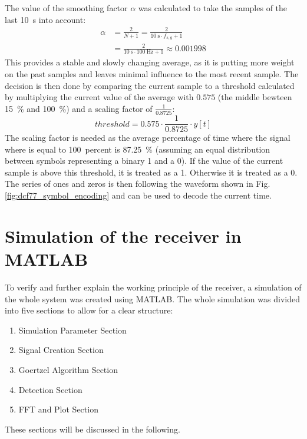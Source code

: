 \documentclass[conference]{IEEEtran}
\begin{document}
\FloatBarrier\noindent
The value of the smoothing factor $\alpha$ was calculated to take the samples of the last \SI{10}{\second} into account:
\begin{equation}
    \begin{split}
        \alpha &= \frac{2}{N + 1} = \frac{2}{\SI{10}{\second} \cdot f_{s,g} + 1}\\
        &= \frac{2}{\SI{10}{\second} \cdot \SI{100}{\hertz} + 1} \approx 0.001998
    \end{split}
    \label{eqn:ema-alpha}
\end{equation}
This provides a stable and slowly changing average, as it is putting more weight on the past samples and leaves minimal influence to the most recent sample.
The decision is then done by comparing the current sample to a threshold calculated by multiplying the current value of the average with $0.575$ (the middle bewteen \SI{15}{\percent} and \SI{100}{\percent}) and a scaling factor of $\frac{1}{0.8725}$:
\begin{equation}
    threshold = 0.575 \cdot \frac{1}{0.8725} \cdot y[t]
    \label{eqn:thresh}
\end{equation}
The scaling factor is needed as the average percentage of time where the signal where is equal to \SI{100}{percent} is \SI{87.25}{\percent} (assuming an equal distribution between symbols representing a binary 1 and a 0).
If the value of the current sample is above this threshold, it is treated as a 1.
Otherwise it is treated as a 0.
The series of ones and zeros is then following the waveform shown in Fig. \ref{fig:dcf77_symbol_encoding} and can be used to decode the current time. 

\section{Simulation of the receiver in MATLAB}
To verify and further explain the working principle of the receiver, a simulation of the whole system was created using MATLAB.
The whole simulation was divided into five sections to allow for a clear structure:
\begin{enumerate}
    \item Simulation Parameter Section
    \item Signal Creation Section
    \item Goertzel Algorithm Section
    \item Detection Section
    \item FFT and Plot Section
\end{enumerate}
These sections will be discussed in the following.
\end{document}
